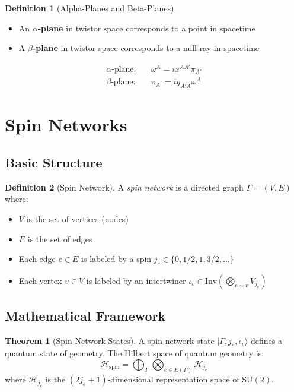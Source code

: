 \documentclass[12pt,a4paper]{article}
\theoremstyle{definition}
\newtheorem{definition}{Definition}[section]
\newtheorem{theorem}{Theorem}[section]
\newcommand{\SU}{\mathrm{SU}}
\newcommand{\hilbert}{\mathcal{H}}
\begin{document}
\begin{definition}[Alpha-Planes and Beta-Planes]
\begin{itemize}
    \item An \textbf{$\alpha$-plane} in twistor space corresponds to a point in spacetime
    \item A \textbf{$\beta$-plane} in twistor space corresponds to a null ray in spacetime
\end{itemize}
\end{definition}

\begin{equation}
\begin{aligned}
\text{$\alpha$-plane:} &\quad \omega^A = ix^{AA'}\pi_{A'} \\
\text{$\beta$-plane:} &\quad \pi_{A'} = iy_{A'A}\omega^A
\end{aligned}
\end{equation}

\section{Spin Networks}

\subsection{Basic Structure}

\begin{definition}[Spin Network]
A \emph{spin network} is a directed graph $\Gamma = (V, E)$ where:
\begin{itemize}
    \item $V$ is the set of vertices (nodes)
    \item $E$ is the set of edges
    \item Each edge $e \in E$ is labeled by a spin $j_e \in \{0, 1/2, 1, 3/2, \ldots\}$
    \item Each vertex $v \in V$ is labeled by an intertwiner $\iota_v \in \mathrm{Inv}(\bigotimes_{e \sim v} V_{j_e})$
\end{itemize}
\end{definition}

\subsection{Mathematical Framework}

\begin{theorem}[Spin Network States]
A spin network state $|\Gamma, j_e, \iota_v\rangle$ defines a quantum state of geometry. The Hilbert space of quantum geometry is:
\begin{equation}
\hilbert_{\text{spin}} = \bigoplus_{\Gamma} \bigotimes_{e \in E(\Gamma)} \hilbert_{j_e}
\end{equation}
where $\hilbert_{j_e}$ is the $(2j_e+1)$-dimensional representation space of $\SU(2)$.
\end{theorem}
\end{document}
